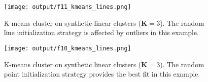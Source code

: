 \documentclass[12pt]{report}
\begin{document}
\begin{enumerate}
    \begin{figure}[H]
        \centering
        \texttt{[image: output/f11\_kmeans\_lines.png]}
        \caption{K-means cluster on synthetic linear clusters ($\mathbf{K}=3$). The random line initialization strategy is affected by outliers in this example.}
        \label{fig:Figure10}
    \end{figure}

    \begin{figure}[H]
        \centering
        \texttt{[image: output/f10\_kmeans\_lines.png]}
        \caption{K-means cluster on synthetic linear clusters ($\mathbf{K}=3$). The random point initialization strategy provides the best fit in this example.}
        \label{fig:Figure11}
    \end{figure}

\end{enumerate}
\end{document}
